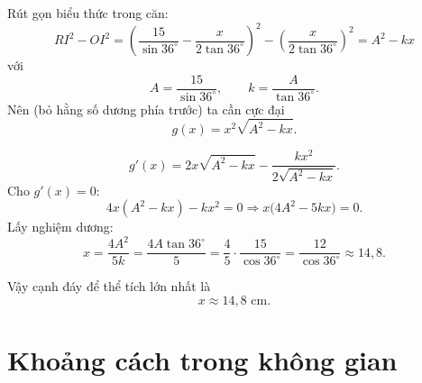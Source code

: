 \begin{loigiai}
Rút gọn biểu thức trong căn:
\[
RI^2-OI^2
=\left(\frac{15}{\sin36^\circ}-\frac{x}{2\tan36^\circ}\right)^2
-\left(\frac{x}{2\tan36^\circ}\right)^2
=A^2-kx
\]
với
\[
A=\frac{15}{\sin36^\circ},\qquad k=\frac{A}{\tan36^\circ}.
\]
Nên (bỏ hằng số dương phía trước) ta cần cực đại
\[
g(x)=x^2\sqrt{A^2-kx}.
\]

\[
g'(x)=2x\sqrt{A^2-kx}-\frac{kx^2}{2\sqrt{A^2-kx}}.
\]
Cho $g'(x)=0$:
\[
4x(A^2-kx)-kx^2=0
\Rightarrow x\bigl(4A^2-5kx\bigr)=0.
\]
Lấy nghiệm dương:
\[
x=\frac{4A^2}{5k}
=\frac{4A\tan36^\circ}{5}
=\frac{4}{5}\cdot\frac{15}{\cos36^\circ}
=\frac{12}{\cos36^\circ}\approx 14{,}8.
\]

Vậy cạnh đáy để thể tích lớn nhất là
\[
\boxed{x\approx 14{,}8\text{ cm}}.
\]
\end{loigiai}

\separator

\section{Khoảng cách trong không gian}

